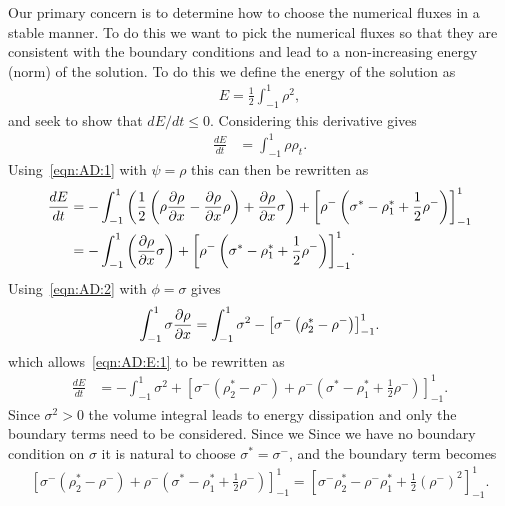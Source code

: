 \documentclass{report}
\begin{document}
Our primary concern is to determine how to choose the numerical fluxes in a
stable manner. To do this we want to pick the numerical fluxes so that they are
consistent with the boundary conditions and lead to a non-increasing energy
(norm) of the solution. To do this we define the energy of the solution as
\begin{align}
  E = \frac{1}{2}\int_{-1}^{1} \rho^2,
\end{align}
and seek to show that $dE/dt \le 0$. Considering this derivative gives
\begin{align}
  \frac{d E}{dt} &= \int_{-1}^{1} \rho \rho_{t}.
\end{align}
Using~\eqref{eqn:AD:1} with $\psi = \rho$ this can then be rewritten as
\begin{align}
  \notag
  \frac{d E}{dt} &=
  -\int_{-1}^{1} \left(
  \frac{1}{2}\left(\rho \frac{\partial \rho}{\partial x} - \frac{\partial \rho}{\partial x} \rho\right)
  + \frac{\partial \rho}{\partial x} \sigma\right) + {\left[\rho^{-}\left(\sigma^{*} - \rho_{1}^{*} +
  \frac{1}{2} \rho^{-}\right)\right]}_{-1}^{1}\\
  \label{eqn:AD:E:1}
  &=
  -\int_{-1}^{1} \left(\frac{\partial \rho}{\partial x} \sigma\right) +
  {\left[\rho^{-}\left(\sigma^{*} - \rho_{1}^{*} + \frac{1}{2}
  \rho^{-}\right)\right]}_{-1}^{1}.
\end{align}
Using~\eqref{eqn:AD:2} with $\phi = \sigma$ gives
\begin{align}
  \int_{-1}^{1} \sigma\frac{\partial \rho}{\partial x} =
  \int_{-1}^{1} \sigma^2 -
  {\left[\sigma^{-}\left(\rho_{2}^{*} - \rho^{-}\right) \right]}_{-1}^{1}.
\end{align}
which allows~\eqref{eqn:AD:E:1} to be rewritten as
\begin{align}
  \frac{d E}{dt} &=
  -\int_{-1}^{1} \sigma^2
  +{\left[\sigma^{-}\left(\rho_{2}^{*} - \rho^{-}\right)
  +
  \rho^{-}\left(\sigma^{*} - \rho_{1}^{*} + \frac{1}{2}
  \rho^{-}\right)\right]}_{-1}^{1}.
\end{align}
Since $\sigma^{2} > 0$ the volume integral leads to energy dissipation and only
the boundary terms need to be considered. Since we
Since we have no boundary condition on $\sigma$ it is natural to choose
$\sigma^{*} = \sigma^{-}$, and the boundary term becomes
\begin{align}
  {\left[\sigma^{-}\left(\rho_{2}^{*} - \rho^{-}\right)
  +
  \rho^{-}\left(\sigma^{*} - \rho_{1}^{*} + \frac{1}{2}
  \rho^{-}\right)\right]}_{-1}^{1}
  =
  {\left[\sigma^{-}\rho_{2}^{*}
  -
  \rho^{-}\rho_{1}^{*} + \frac{1}{2}
  {\left(\rho^{-}\right)}^{2}\right]}_{-1}^{1}.
\end{align}
\end{document}
